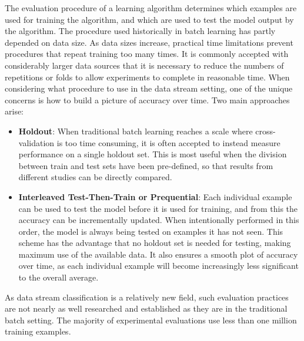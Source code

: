 \documentclass[a4paper,12pt,twoside]{book}
\begin{document}
The evaluation procedure of a learning algorithm determines which examples
are used for training the algorithm, and which are used to test the model output
by the algorithm. The procedure used historically in batch learning has partly
depended on data size. As data sizes increase, practical
time limitations prevent procedures that repeat training too many times. It is
commonly accepted with considerably larger data sources that it is necessary
to reduce the numbers of repetitions or folds to allow experiments to complete
in reasonable time. 
    When considering what procedure to use in the data stream setting, one of
the unique concerns is how to build a picture of accuracy over time. Two main
approaches arise:
\begin{itemize}
 \item {\bf Holdout}:
When traditional batch learning reaches a scale where cross-validation is too time 
consuming, it is often accepted to instead measure performance on a single holdout
set. This is most useful when the division between train and test sets have
been pre-defined, so that results from different studies can be directly compared. 
\item {\bf Interleaved Test-Then-Train or Prequential}:
 Each individual example can be used to test the model
before it is used for training, and from this the accuracy can be incrementally
updated. When intentionally performed in this order, the model is always
being tested on examples it has not seen. This scheme has the advantage that
no holdout set is needed for testing, making maximum use of the available
data. It also ensures a smooth plot of accuracy over time, as each individual
example will become increasingly less significant to the overall average.
\end{itemize}
   As data stream classification is a relatively new field, such evaluation 
practices are not nearly as well researched and established as they are
in the traditional batch setting. 
The majority of experimental evaluations use less than one million
training examples. 
\end{document}
